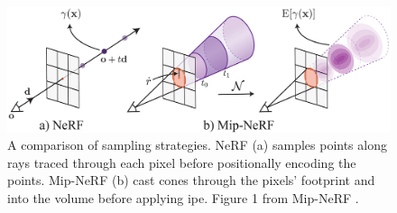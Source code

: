 \begin{figure}[ht]
    \centering
    \includegraphics[width=1.0\textwidth]{figures/mip-nerf-frustums.png}
    \caption[Illustration of positional encoding]{A comparison of sampling strategies. NeRF (a) samples points along rays traced through each pixel before positionally encoding the points. Mip-NeRF (b) cast cones through the pixels' footprint and into the volume before applying \acrfull{ipe}. Figure 1 from Mip-NeRF \cite{barron_mip-nerf_2021}.}
    \label{fig:mip-nerf-frustums}
\end{figure}